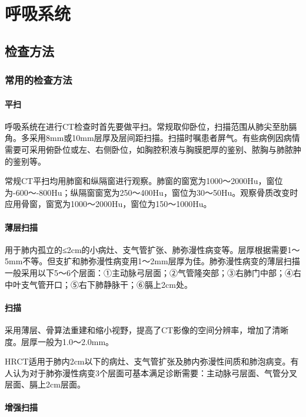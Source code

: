 \chapter{呼吸系统}

\section{检查方法}

\subsection{常用的检查方法}

\subsubsection{平扫}

呼吸系统在进行CT检查时首先要做平扫。常规取仰卧位，扫描范围从肺尖至肋膈角。多采用8mm或10mm层厚及层间距扫描。扫描时嘱患者屏气。有些病例因病情需要可采用俯卧位或左、右侧卧位，如胸腔积液与胸膜肥厚的鉴别、脓胸与肺脓肿的鉴别等。

常规CT平扫均用肺窗和纵隔窗进行观察。肺窗的窗宽为1000～2000Hu，窗位为-600～-800Hu；纵隔窗窗宽为250～400Hu，窗位为30～50Hu。观察骨质改变时应用骨窗，窗宽为1000～2000Hu，窗位为150～1000Hu。

\subsubsection{薄层扫描}

用于肺内孤立的≤2cm的小病灶、支气管扩张、肺弥漫性病变等。层厚根据需要1～5mm不等。但支扩和肺弥漫性病变用1～2mm层厚为佳。肺弥漫性病变的薄层扫描一般采用以下5～6个层面：①主动脉弓层面；②气管隆突部；③右肺门中部；④右中叶支气管开口；⑤右下肺静脉干；⑥膈上2cm处。

\subsubsection{扫描}

采用薄层、骨算法重建和缩小视野，提高了CT影像的空间分辨率，增加了清晰度。层厚一般为1.0～2.0mm。

HRCT适用于肺内2cm以下的病灶、支气管扩张及肺内弥漫性间质和肺泡病变。有人认为对于肺弥漫性病变3个层面可基本满足诊断需要：主动脉弓层面、气管分叉层面、膈上2cm层面。

\subsubsection{增强扫描}

